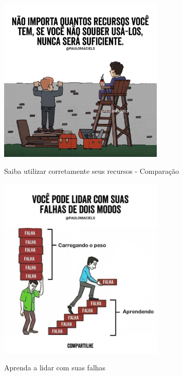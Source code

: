 \begin{figure}
    \centering
    \caption{Saiba utilizar corretamente seus recursos - Comparação}
	\includegraphics[width=0.7\textwidth]{erros/uso_de_recursos_escada_2.jpg}
    \label{fig:uso_recursos_escada_2}
\end{figure}




\begin{figure}
    \centering
    \caption{Aprenda a lidar com suas falhas}
	\includegraphics[width=0.7\textwidth]{erros/lidar_com_falhas.jpg}
    \label{fig:lidar_com_falhas}
\end{figure}

